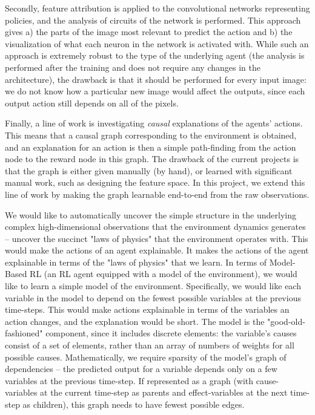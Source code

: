 \documentclass[a4paper,11pt,oneside]{report}
\begin{document}
Secondly, feature attribution is applied to the convolutional networks representing policies, and the analysis of circuits of the network is performed. This approach gives a) the parts of the image most relevant to predict the action and b) the visualization of what each neuron in the network is activated with. While such an approach is extremely robust to the type of the underlying agent (the analysis is performed after the training and does not require any changes in the architecture), the drawback is that it should be performed for every input image: we do not know how a particular new image would affect the outputs, since each output action still depends on all of the pixels.

Finally, a line of work is investigating {\em causal} explanations of the agents' actions. This means that a causal graph corresponding to the environment is obtained, and an explanation for an action is then a simple path-finding from the action node to the reward node in this graph. The drawback of the current projects is that the graph is either given manually (by hand), or learned with significant manual work, such as designing the feature space. In this project, we extend this line of work by making the graph learnable end-to-end from the raw observations.

We would like to automatically uncover the simple structure in the underlying complex high-dimensional observations that the environment dynamics generates -- uncover the succinct "laws of physics" that the environment operates with.
This would make the actions of an agent explainable.
It makes the actions of the agent explainable in terms of the "laws of physics" that we learn. In terms of Model-Based RL (an RL agent equipped with a model of the environment), we would like to learn a simple model of the environment.
Specifically, we would like each variable in the model to depend on the fewest possible variables at the previous time-steps. This would make actions explainable in terms of the variables an action changes, and the explanation would be short. The model is the "good-old-fashioned" component, since it includes discrete elements: the variable's causes consist of a set of elements, rather than an array of numbers of weights for all possible causes.
Mathematically, we require sparsity of the model's graph of dependencies -- the predicted output for a variable depends only on a few variables at the previous time-step. If represented as a graph (with cause-variables at the current time-step as parents and effect-variables at the next time-step as children), this graph needs to have fewest possible edges.
\end{document}
